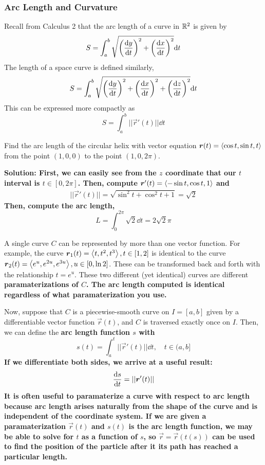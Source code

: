 \subsubsection{Arc Length and Curvature}
Recall from Calculus 2 that the arc length of a curve in \(\mathbb{R}^2\) is given by
\[ S = \int_a^b\sqrt{\pqty{\dv{y}{t}}^2+\pqty{\dv{x}{t}}^2}\dd t \]
The length of a space curve is defined similarly,
\[ S = \int_a^b\sqrt{\pqty{\dv{y}{t}}^2 + \pqty{\dv{x}{t}}^2+\pqty{\dv{z}{t}}^2}\dd t\]
This can be expressed more compactly as
\[ S = \int_a^b ||\vec r'(t)||\dd t\]
\begin{example}
    Find the arc length of the circular helix with vector equation \(\boldsymbol{r}(t) = \left\langle\cos t, \sin t, t\right\rangle\) from the point \((1, 0, 0)\) to the point \((1, 0, 2\pi)\).\par\bf{Solution: }First, we can easily see from the \(z\) coordinate that our \(t\) interval is \(t\in[0, 2\pi]\). Then, compute \(\boldsymbol{r}'(t) = \left\langle-\sin t, \cos t, 1\right\rangle\) and 
    \begin{align*}
        ||\vec r'(t)|| = \sqrt{\sin^2t + \cos^2t + 1} = \sqrt 2
    \end{align*}
    Then, compute the arc length,
    \[ L = \int_0^{2\pi}\sqrt 2 \dd t = 2\sqrt 2 \pi\]
\end{example}
A single curve \(C\) can be represented by more than one vector function. For example, the curve \(\boldsymbol{r}_1(t) = \left\langle t, t^2, t^3\right\rangle, t\in [1, 2]\) is identical to the curve \(\boldsymbol{r}_2(t) = \left\langle e^u, e^{2u}, e^{3u}\right\rangle, u\in[0, \ln 2]\). These can be transformed back and forth with the relationship \(t = e^u\). These two different (yet identical) curves are different \bf{paramaterizations} of \(C\). The arc length computed is identical regardless of what paramaterization you use. \par Now, suppose that \(C\) is a piecewise-smooth curve on \(I=[a, b]\) given by a differentiable vector function \(\vec r(t)\), and \(C\) is traversed exactly once on \(I\). Then, we can define the \bf{arc length function} \(s\) with
\[ s(t) = \int_a^t ||\vec r'(t)||\dd t, \quad t\in (a, b]\]
If we differentiate both sides, we arrive at a useful result: \[\dv{s}{t}=||\boldsymbol{r}'(t)||\]It is often useful to paramaterize a curve with respect to arc length because arc length arises naturally from the shape of the curve and is independent of the coordinate system. If we are given a paramaterization \(\vec r(t)\) and \(s(t)\) is the arc length function, we may be able to solve for \(t\) as a function of \(s\), so \(\vec r = \vec r(t(s))\) can be used to find the position of the particle after it its path has reached a particular length.
